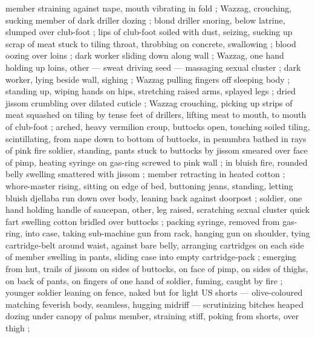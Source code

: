 member straining against nape, mouth vibrating in fold {\col} {\thd}  ; Wazzag, crouching, sucking member of dark driller dozing ; blond driller snoring, below latrine, slumped over club-foot ; lips of club-foot soiled with dust, seizing, sucking up scrap of meat stuck to tiling {\col} throat, throbbing on concrete, swallowing ; blood oozing over loins ; dark worker sliding down along wall ; Wazzag, one hand holding up loins, other --- sweat driving seed --- massaging sexual cluster ; dark worker, lying beside wall, sighing ; Wazzag pulling fingers off sleeping body ; standing up, wiping hands on hips, stretching raised arms, splayed legs ; dried jissom crumbling over dilated cuticle ; Wazzag crouching, picking up strips of meat squashed on tiling by tense feet of drillers, lifting meat to mouth, to mouth of club-foot ; arched, heavy vermilion croup, buttocks open, touching soiled tiling, scintillating, from nape down to bottom of buttocks, in penumbra bathed in rays of pink fire {\semislash} soldier, standing, pants stuck to buttocks by jissom smeared over face of pimp, heating syringe on gas-ring screwed to pink wall ; in bluish fire, rounded belly swelling smattered with jissom ; member retracting in heated cotton ; whore-master rising, sitting on edge of bed, buttoning jeans, standing, letting bluish djellaba run down over body, leaning back against doorpost ; soldier, one hand holding handle of saucepan, other, leg raised, scratching sexual cluster {\col} quick fart swelling cotton bridled over buttocks ; packing syringe, removed from gas-ring, into case, taking sub-machine gun from rack, hanging gun on shoulder, tying cartridge-belt around waist, against bare belly, arranging cartridges on each side of member swelling in pants, sliding case into empty cartridge-pack ; emerging from hut, trails of jissom on sides of buttocks, on face of pimp, on sides of thighs, on back of pants, on fingers of one hand of soldier, fuming, caught by fire ; younger soldier leaning on fence, naked but for light US shorts --- olive-coloured matching feverish body, seamless, hugging midriff --- scrutinizing bitches heaped dozing under canopy of palms {\col} member, straining stiff, poking from shorts, over thigh ; 
